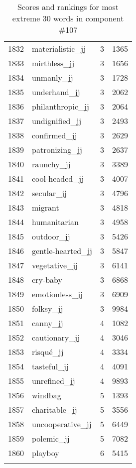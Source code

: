 \begin{longtable}[!htbp]{| rlr@{.}l |}
    1832 & materialistic\_jj & 3 & 1365 \\
    1833 & mirthless\_jj & 3 & 1656 \\
    1834 & unmanly\_jj & 3 & 1728 \\
    1835 & underhand\_jj & 3 & 2062 \\
    1836 & philanthropic\_jj & 3 & 2064 \\
    1837 & undignified\_jj & 3 & 2493 \\
    1838 & confirmed\_jj & 3 & 2629 \\
    1839 & patronizing\_jj & 3 & 2637 \\
    1840 & raunchy\_jj & 3 & 3389 \\
    1841 & cool-headed\_jj & 3 & 4007 \\
    1842 & secular\_jj & 3 & 4796 \\
    1843 & migrant & 3 & 4818 \\
    1844 & humanitarian & 3 & 4958 \\
    1845 & outdoor\_jj & 3 & 5426 \\
    1846 & gentle-hearted\_jj & 3 & 5847 \\
    1847 & vegetative\_jj & 3 & 6141 \\
    1848 & cry-baby & 3 & 6868 \\
    1849 & emotionless\_jj & 3 & 6909 \\
    1850 & folksy\_jj & 3 & 9984 \\
    1851 & canny\_jj & 4 & 1082 \\
    1852 & cautionary\_jj & 4 & 3046 \\
    1853 & risqué\_jj & 4 & 3334 \\
    1854 & tasteful\_jj & 4 & 4091 \\
    1855 & unrefined\_jj & 4 & 9893 \\
    1856 & windbag & 5 & 1393 \\
    1857 & charitable\_jj & 5 & 3556 \\
    1858 & uncooperative\_jj & 5 & 6449 \\
    1859 & polemic\_jj & 5 & 7082 \\
    1860 & playboy & 6 & 5415 \\
    \hline
    \caption{Scores and rankings for most extreme 30 words in component \#107} \\
\end{longtable}
